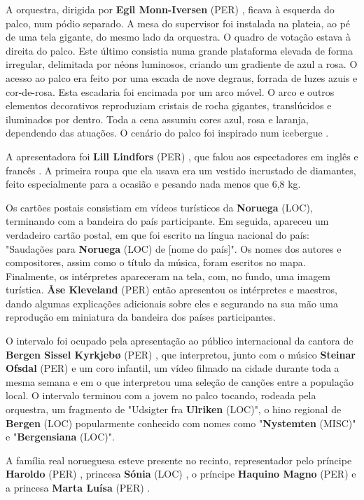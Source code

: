 \documentclass[12pt,a4paper]{article}
\begin{document}
A orquestra, dirigida por \textbf{Egil Monn-Iversen} (PER) , ficava à esquerda do palco, num pódio separado. A mesa do supervisor foi instalada na plateia, ao pé de uma tela gigante, do mesmo lado da orquestra. O quadro de votação estava à direita do palco. Este último consistia numa grande plataforma elevada de forma irregular, delimitada por néons luminosos, criando um gradiente de azul a rosa. O acesso ao palco era feito por uma escada de nove degraus, forrada de luzes azuis e cor-de-rosa. Esta escadaria foi encimada por um arco móvel. O arco e outros elementos decorativos reproduziam cristais de rocha gigantes, translúcidos e iluminados por dentro. Toda a cena assumiu cores azul, rosa e laranja, dependendo das atuações. O cenário do palco foi inspirado num icebergue .

A apresentadora foi \textbf{Lill Lindfors} (PER) , que falou aos espectadores em inglês e francês . A primeira roupa que ela usava era um vestido incrustado de diamantes, feito especialmente para a ocasião e pesando nada menos que 6,8 kg.

Os cartões postais consistiam em vídeos turísticos da \textbf{Noruega} (LOC), terminando com a bandeira do país participante. Em seguida, apareceu um verdadeiro cartão postal, em que foi escrito na língua nacional do país: "Saudações para \textbf{Noruega} (LOC) de [nome do país]". Os nomes dos autores e compositores, assim como o título da música, foram escritos no mapa. Finalmente, os intérpretes apareceram na tela, com, no fundo, uma imagem turística. \textbf{Åse Kleveland} (PER) então apresentou os intérpretes e maestros, dando algumas explicações adicionais sobre eles e segurando na sua mão uma reprodução em miniatura da bandeira dos países participantes.

O intervalo foi ocupado pela apresentação ao público internacional da cantora de \textbf{Bergen Sissel Kyrkjebø} (PER) , que interpretou, junto com o músico \textbf{Steinar Ofsdal} (PER) e um coro infantil, um vídeo filmado na cidade durante toda a mesma semana e em o que interpretou uma seleção de canções entre a população local. O intervalo terminou com a jovem no palco tocando, rodeada pela orquestra, um fragmento de "Udsigter fra \textbf{Ulriken} (LOC)", o hino regional de \textbf{Bergen} (LOC) popularmente conhecido com nomes como "\textbf{Nystemten} (MISC)" e "\textbf{Bergensiana} (LOC)".

A família real norueguesa esteve presente no recinto, representador pelo príncipe \textbf{Haroldo} (PER) , princesa \textbf{Sónia} (LOC) , o príncipe \textbf{Haquino Magno} (PER) e a princesa \textbf{Marta Luísa} (PER) .
\end{document}
